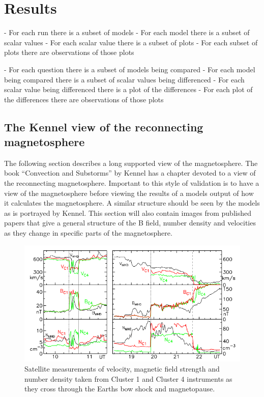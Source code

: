 \chapter[Results]{Results}
- For each run there is a subset of models
- For each model there is a subset of scalar values
- For each scalar value there is a subset of plots
- For each subset of plots there are observations of those plots

- For each question there is a subset of models being compared
- For each model being compared there is a subset of scalar values being
differenced
- For each scalar value being differenced there is a plot of the differences
- For each plot of the differences there are observations of those plots

\section[The Reconnecting Magnetosphere]{The Kennel view of the reconnecting
magnetosphere} The following section describes a long supported view of the magnetosphere. The
book ``Convection and Substorms'' by Kennel \cite{Kennel} has a chapter devoted
to a view of the reconnecting magnetosphere. Important to this style of
validation is to have a view of the magnetosphere before viewing the results of
a models output of how it calculates the magnetosphere. A similar structure
should be seen by the models as is portrayed by Kennel. This section will also
contain images from published papers that give a general structure of the B
field, number density and velocities as they change in specific parts of the
magnetosphere.
\begin{figure}
	\centering
	\includegraphics[scale=0.5]{images/MPandShock_VBN.png}
	\caption{Satellite measurements of velocity, magnetic field strength and
	number density taken from Cluster 1 and Cluster 4 instruments as they
	cross through the Earths bow shock and magnetopause.}
    \label{fig:MPandShock_VBN}
	\figSpace
\end{figure}

